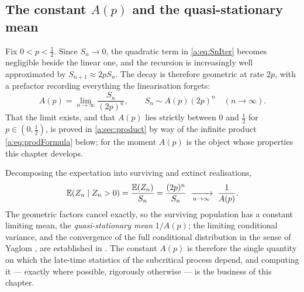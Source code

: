\subsection{The constant \texorpdfstring{$A(p)$}{A(p)} and the quasi-stationary mean}
\label{a:sec:setupAp}

Fix $0<p<\tfrac12$. Since $S_n\to0$, the quadratic term in \cref{a:eq:SnIter}
becomes negligible beside the linear one, and the recursion is increasingly well
approximated by $S_{n+1}\approx2pS_n$. The decay is therefore geometric at rate
$2p$, with a prefactor recording everything the linearisation forgets:
\begin{equation}
\label{a:eq:Apdef}
A(p) = \lim_{n\to\infty}\frac{S_n}{(2p)^n},
\qquad
S_n \sim A(p)(2p)^n \quad(n\to\infty) .
\end{equation}
That the limit exists, and that $A(p)$ lies strictly between $0$ and $\tfrac12$
for $p\in(0,\tfrac12)$, is proved in \cref{a:sec:product} by way of the infinite
product \cref{a:eq:prodFormula} below; for the moment $A(p)$ is the object whose
properties this chapter develops.

Decomposing the expectation into surviving and extinct realisations,
\begin{equation}
\label{a:eq:condmean}
\mathbb{E}\!\left(Z_n\mid Z_n>0\right) = \frac{\mathbb{E}\!\left(Z_n\right)}{S_n} = \frac{(2p)^n}{S_n}
\;\xrightarrow[n\to\infty]{}\;
\frac{1}{A(p)} .
\end{equation}
The geometric factors cancel exactly, so the surviving population has a constant
limiting mean, the \emph{quasi-stationary mean} $1/A(p)$; the limiting conditional
variance, and the convergence of the full conditional distribution in the sense of
Yaglom \cite{Yaglom1947}, are established in \ChM. The constant $A(p)$ is
therefore the single quantity on which the late-time statistics of the subcritical
process depend, and computing it --- exactly where possible, rigorously otherwise
--- is the business of this chapter.

\FloatBarrier
